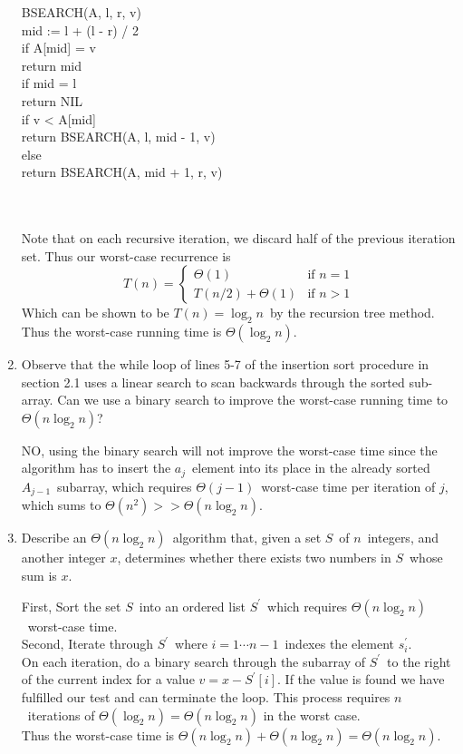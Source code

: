 \documentclass{article}
\newcommand{\?}{\stackrel{?}{=}}
\newcommand\Ans[2][]{%
   \leavevmode\noindent
   {
       \begin{mdframed}[backgroundcolor=blue!10]
       #2
       \end{mdframed}
   }
}
\begin{document}
\begin{enumerate}
	\Ans{
	  \setlength{\parindent}{5ex}
	  \begin{tt}
	  	BSEARCH(A, l, r, v) \\
	  	\indent mid := l + (l - r) / 2 \\
	  	\indent if A[mid] = v \\
	  	\indent \indent return mid \\
	  	\indent if mid = l \\
	  	\indent \indent return NIL \\
	  	\indent if v < A[mid] \\
	  	\indent \indent return BSEARCH(A, l, mid - 1, v) \\
	  	\indent else \\
	  	\indent \indent return BSEARCH(A, mid + 1, r, v)
	  \end{tt}	\\~\\
	  Note that on each recursive iteration, we discard half of the previous iteration set.  Thus our worst-case recurrence is
	  \[
	     T(n)=\begin{cases} \Theta(1) & \text{if }n=1\\
	                        T(n/2) + \Theta(1) & \text{if }n>1 \end{cases}
	  \]
	  Which can be shown to be $T(n) = \log_2n$\ by the recursion tree method.  Thus the worst-case running time is $\Theta(\log_2n)$.
	}
	\newpage
	\item Observe that the while loop of lines 5-7 of the insertion sort procedure in section 2.1 uses a linear search to scan backwards through the sorted sub-array.  Can we use a binary search to improve the worst-case running time to $\Theta(n\log_2 n)$?
	\Ans{NO, using the binary search will not improve the worst-case time since the algorithm has to insert the $a_j$\ element into its place in the already sorted $A_{j-1}$\ subarray, which requires $\Theta(j-1)$\ worst-case time per iteration of $j$, which sums to $\Theta(n^2) >> \Theta(n\log_2n)$.}
	\item Describe an $\Theta(n\log_2n)$\ algorithm that, given a set $S$\ of $n$\ integers, and another integer $x$, determines whether there exists two numbers in $S$\ whose sum is $x$.
	\Ans{
		First, Sort the set $S$\ into an ordered list $S^\prime$\ which requires $\Theta(n\log_2n)$\ worst-case time.\\
		Second, Iterate through $S^\prime$\ where $i=1\cdots n-1$\ indexes the element $s^\prime_i$. \\
		On each iteration, do a binary search through the subarray of $S^\prime$\ to the right of the current index for a value $v=x - S^\prime[i]$.  If the value is found we have fulfilled our test and can terminate the loop.  This process requires $n$\ iterations of $\Theta(\log_2n) = \Theta(n\log_2n)$ in the worst case. \\
		Thus the worst-case time is $\Theta(n\log_2n) + \Theta(n\log_2n) = \Theta(n\log_2n)$.
		}
\end{enumerate} 
\end{document}
